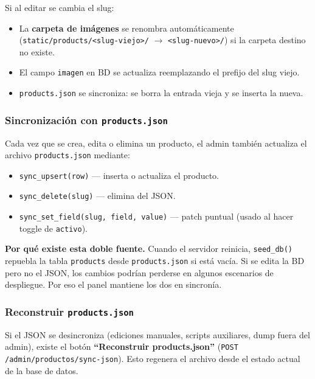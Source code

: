 \documentclass[11pt,a4paper]{article}
\begin{document}
Si al editar se cambia el slug:

\begin{itemize}[leftmargin=*]
    \item La \textbf{carpeta de imágenes} se renombra automáticamente
        (\texttt{static/products/<slug-viejo>/} $\rightarrow$
        \texttt{<slug-nuevo>/}) si la carpeta destino no existe.
    \item El campo \texttt{imagen} en BD se actualiza reemplazando el
        prefijo del slug viejo.
    \item \texttt{products.json} se sincroniza: se borra la entrada vieja
        y se inserta la nueva.
\end{itemize}

\subsubsection{Sincronización con \texttt{products.json}}

Cada vez que se crea, edita o elimina un producto, el admin también
actualiza el archivo \texttt{products.json} mediante:

\begin{itemize}[leftmargin=*]
    \item \texttt{sync\_upsert(row)} --- inserta o actualiza el producto.
    \item \texttt{sync\_delete(slug)} --- elimina del JSON.
    \item \texttt{sync\_set\_field(slug, field, value)} --- patch puntual
        (usado al hacer toggle de \texttt{activo}).
\end{itemize}

\begin{warningbox}
\textbf{Por qué existe esta doble fuente.} Cuando el servidor reinicia,
\texttt{seed\_db()} repuebla la tabla \texttt{products} desde
\texttt{products.json} si está vacía. Si se edita la BD pero no el JSON,
los cambios podrían perderse en algunos escenarios de despliegue. Por eso
el panel mantiene los dos en sincronía.
\end{warningbox}

\subsubsection{Reconstruir \texttt{products.json}}

Si el JSON se desincroniza (ediciones manuales, scripts auxiliares, dump
fuera del admin), existe el botón \textbf{``Reconstruir products.json''}
(\texttt{POST /admin/productos/sync-json}). Esto regenera el archivo
desde el estado actual de la base de datos.
\end{document}
